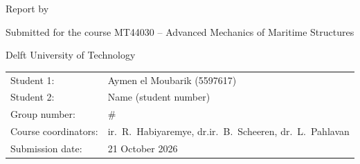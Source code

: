 \begin{titlepage}

\begin{center}

{\makeatletter\headingfont
\fontsize{60}{60}\selectfont\@title{}
\makeatother}

{\makeatletter
\ifx\@subtitle\undefined\else
  \bigskip
  {\headingfont\fontsize{22}{32}\selectfont\@subtitle}
\fi
\makeatother}

\bigskip
\bigskip

Report by

\bigskip
\bigskip

{\makeatletter
\fontsize{26}{26}\selectfont\@author{}
\makeatother}

\bigskip
\bigskip

Submitted for the course MT44030 -- Advanced Mechanics of Maritime Structures

Delft University of Technology

\vfill

\begin{tabular}{ll}
  Student 1: & Aymen el Moubarik (5597617) \\
  Student 2: & Name (student number) \\
  Group number: & \# \\
  Course coordinators: & ir.\ R.\ Habiyaremye, dr.ir.\ B.\ Scheeren, dr.\ L.\ Pahlavan \\
  Submission date: & 21 October 2026
\end{tabular}

\vspace{25mm}
\makeatletter
\scalebox{3}{
  \if@print%
    \tudlogo[black]
  \else
    \tudlogo%
  \fi
}
\makeatother
\end{center}

\end{titlepage}
